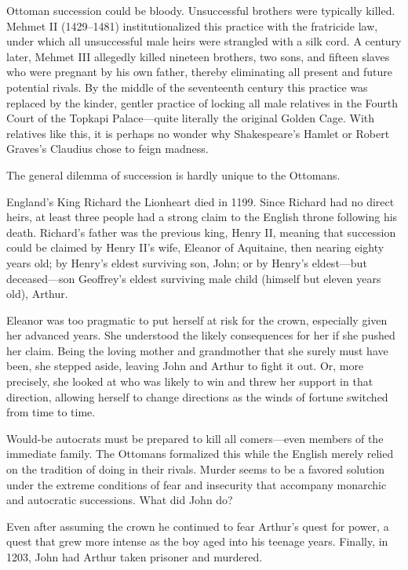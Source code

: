 \documentclass[10pt]{article}
\begin{document}
{\large Ottoman succession could be bloody. Unsuccessful brothers were typically
killed. Mehmet II (1429--1481) institutionalized this practice with the
fratricide law, under which all unsuccessful male heirs were strangled with a
silk cord. A century later, Mehmet III allegedly killed nineteen brothers, two
sons, and fifteen slaves who were pregnant by his own father, thereby eliminating
all present and future potential rivals. By the middle of the seventeenth century
this practice was replaced by the kinder, gentler practice of locking all male
relatives in the Fourth Court of the Topkapi Palace---quite literally the
original Golden Cage. With relatives like this, it is perhaps no wonder why
Shakespeare's Hamlet or Robert Graves's Claudius chose to feign madness.}

{\large The general dilemma of succession is hardly unique to the Ottomans.}

{\large England's King Richard the Lionheart died in 1199. Since Richard had no
direct heirs, at least three people had a strong claim to the English throne
following his death. Richard's father was the previous king, Henry II, meaning
that succession could be claimed by Henry II's wife, Eleanor of Aquitaine, then
nearing eighty years old; by Henry's eldest surviving son, John; or by Henry's
eldest---but deceased---son Geoffrey's eldest surviving male child (himself but
eleven years old), Arthur.}

{\large Eleanor was too pragmatic to put herself at risk for the crown,
especially given her advanced years. She understood the likely consequences for
her if she pushed her claim. Being the loving mother and grandmother that she
surely must have been, she stepped aside, leaving John and Arthur to fight it
out. Or, more precisely, she looked at who was likely to win and threw her
support in that direction, allowing herself to change directions as the winds of
fortune switched from time to time.}

{\large Would-be autocrats must be prepared to kill all comers---even members of
the immediate family. The Ottomans formalized this while the English merely
relied on the tradition of doing in their rivals. Murder seems to be a favored
solution under the extreme conditions of fear and insecurity that accompany
monarchic and autocratic successions. What did John do?}

{\large Even after assuming the crown he continued to fear Arthur's quest for
power, a quest that grew more intense as the boy aged into his teenage years.
Finally, in 1203, John had Arthur taken prisoner and murdered.}
\end{document}
